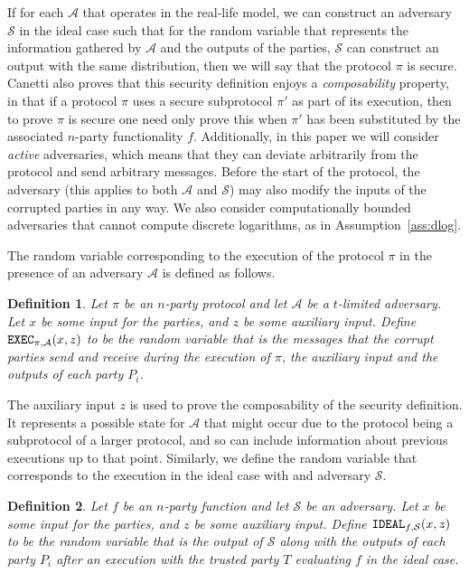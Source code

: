 \documentclass{article}
\newcommand\paper{paper}
\newtheorem{definition}{Definition}
\theoremstyle{remark}
\begin{document}
If for each $\mathcal{A}$ that operates in the real-life model, we can
construct an adversary $\mathcal{S}$ in the ideal case such that for the random
variable that represents the information gathered by $\mathcal{A}$ and the
outputs of the parties, $\mathcal{S}$ can construct an output with the same
distribution, then we will say that the protocol $\pi$ is secure. Canetti also
proves that this security definition enjoys a \textit{composability} property,
in that if a protocol $\pi$ uses a secure subprotocol $\pi'$ as part of its
execution, then to prove $\pi$ is secure one need only prove this when $\pi'$
has been substituted by the associated $n$-party functionality $f$.
Additionally, in this \paper{} we will consider \textit{active} adversaries,
which means that they can deviate arbitrarily from the protocol and send
arbitrary messages. Before the start of the protocol, the adversary (this
applies to both $\mathcal{A}$ and $\mathcal{S}$) may also modify the inputs of
the corrupted parties in any way. We also consider computationally bounded
adversaries that cannot compute discrete logarithms, as in
Assumption~\ref{ass:dlog}.

The random variable corresponding to the execution of the protocol $\pi$ in the
presence of an adversary $\mathcal{A}$ is defined as follows.

\begin{definition}
	Let $\pi$ be an $n$-party protocol and let $\mathcal{A}$ be a $t$-limited
	adversary. Let $x$ be some input for the parties, and $z$ be some auxiliary
	input. Define $\textup{\texttt{EXEC}}_{\pi, \mathcal{A}} (x, z)$ to be the random variable
	that is the messages that the corrupt parties send and receive during the
	execution of $\pi$, the auxiliary input and the outputs of each party
	$P_i$.
\end{definition}

The auxiliary input $z$ is used to prove the composability of the security
definition. It represents a possible state for $\mathcal{A}$ that might occur
due to the protocol being a subprotocol of a larger protocol, and so can
include information about previous executions up to that point. Similarly, we
define the random variable that corresponds to the execution in the ideal case
with and adversary $\mathcal{S}$.

\begin{definition}
	Let $f$ be an $n$-party function and let $\mathcal{S}$ be an adversary. Let
	$x$ be some input for the parties, and $z$ be some auxiliary input. Define
	$\textup{\texttt{IDEAL}}_{f, \mathcal{S}} (x, z)$ to be the random variable that is the output
	of $\mathcal{S}$ along with the outputs of each party $P_i$ after an
	execution with the trusted party $T$ evaluating $f$ in the ideal case.
\end{definition}
\end{document}
